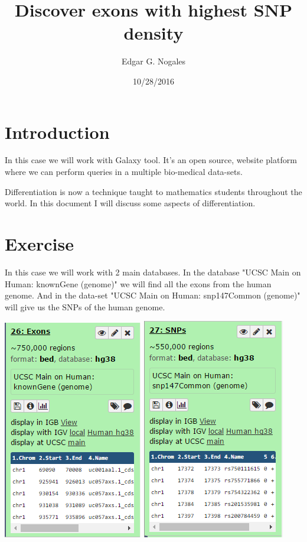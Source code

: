 \documentclass[a4paper]{article}
\title{Discover exons with highest SNP density}
\author{Edgar G. Nogales}
\date{10/28/2016}
\begin{document}
\maketitle
\section{Introduction}

In this case we will work with Galaxy tool. It's an open source, website platform where we can perform queries in a multiple bio-medical data-sets.

Differentiation is now a technique taught to mathematics students throughout the world. In this document I will discuss some aspects of differentiation.

\section{Exercise}

In this case we will work with 2 main databases. In the database "UCSC Main on Human: knownGene (genome)" we will find all the exons from the human genome. And in the data-set "UCSC Main on Human: snp147Common (genome)" will give us the SNPs of the human genome.\\

\centerline{\includegraphics[scale=0.5]{26_Exons.png}
\includegraphics[scale=0.5]{27_SNPs.PNG}}
\end{document}
